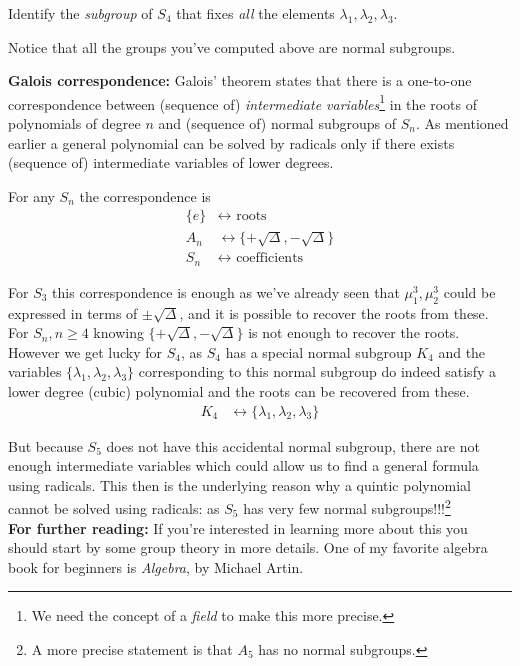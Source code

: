 \begin{questions}[resume]
  \item 
  \label{ques:quartic}
Identify the \emph{subgroup} of $ S_4$ that fixes \emph{all} the elements $ \lambda_1, \lambda_2, \lambda_3$. 
\end{questions}

Notice that all the groups you've computed above are normal subgroups. 

\newpage 
\noindent \textbf{Galois correspondence: } Galois' theorem states that there is a one-to-one correspondence between (sequence of) \emph{intermediate variables}\footnote{We need the concept of a \emph{field} to make this more precise.} in the roots of polynomials of degree $ n$ and (sequence of) normal subgroups of $ S_n$. As mentioned earlier a {general} polynomial can be solved by radicals only if there exists (sequence of) intermediate variables of lower degrees.

For any $ S_n$ the correspondence is
\begin{align*}
  \{ e \} & \leftrightarrow  \mbox{ roots }   \\
  A_n & \leftrightarrow \{ +\sqrt{\Delta}, -\sqrt{\Delta} \} \\
  S_n & \leftrightarrow \mbox{ coefficients }
\end{align*}


For $ S_3$ this correspondence is enough as we've already seen that $ \mu_1^3, \mu_2^3$ could be expressed in terms of $ \pm \sqrt{\Delta} $, and it is possible to recover the roots from these.\\

For $ S_n, n \ge 4$ knowing $ \{ +\sqrt{\Delta}, -\sqrt{\Delta} \} $ is not enough to recover the roots.\\

However we get lucky for $ S_4$, as $ S_4$ has a special normal subgroup $ K_4$ and the variables $ \{ \lambda_1, \lambda_2, \lambda_3 \}$ corresponding to this normal subgroup do indeed satisfy a lower degree (cubic) polynomial and the roots can be recovered from these.
\begin{align*}
  K_4 & \leftrightarrow \{ \lambda_1, \lambda_2, \lambda_3 \}
\end{align*}

But because $ S_5$ does not have this accidental normal subgroup, there are not enough intermediate variables which could allow us to find a general formula using radicals. This then is the underlying reason why a quintic polynomial cannot be solved using radicals: as $ S_5$ has very few normal subgroups!!!\footnote{A more precise statement is that $ A_5$ has no normal subgroups.}\\

\noindent \textbf{For further reading:} If you're interested in learning more about this you should start by some group theory in more details. One of my favorite algebra book for beginners is \emph{Algebra}, by Michael Artin.

